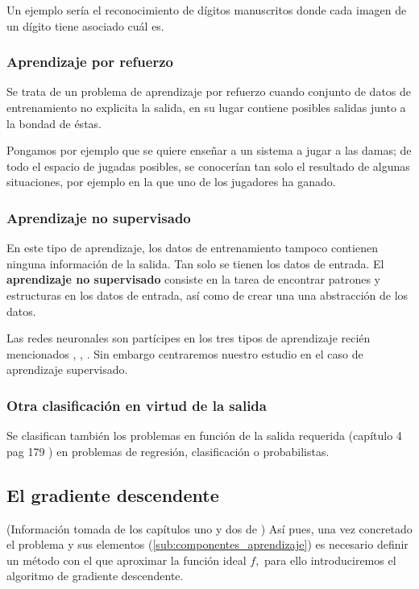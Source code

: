 Un ejemplo sería el reconocimiento de dígitos  manuscritos donde cada imagen de un dígito tiene asociado cuál es. 


\subsubsection{Aprendizaje por refuerzo}  
Se trata de un problema de aprendizaje por refuerzo 
cuando conjunto de datos de entrenamiento no explicita la salida, en su lugar contiene posibles salidas junto a la bondad de éstas. 

Pongamos por ejemplo que se quiere enseñar a un sistema a jugar
a las damas; de todo el espacio de jugadas posibles, se conocerían tan solo el resultado de algunas situaciones, por ejemplo en la que uno de los jugadores ha ganado.  

\subsubsection{Aprendizaje no supervisado}  

En este tipo de aprendizaje, los datos de entrenamiento tampoco contienen ninguna información de la salida.
 Tan solo se tienen los datos de entrada. El \textbf{aprendizaje no supervisado} 
 consiste en la tarea de encontrar patrones y estructuras en los datos de entrada, 
 así como de crear una una abstracción de los datos.  


Las redes neuronales son partícipes en los tres tipos de aprendizaje 
recién mencionados
\cite{8612259}, \cite{DBLP:journals/corr/BakerGNR16}, \cite{10.5555/2955491.2955578}. Sin embargo centraremos nuestro estudio en el caso 
de aprendizaje supervisado. 

\subsubsection*{Otra clasificación en virtud de la salida}

Se clasifican también los problemas en función de la salida requerida (capítulo 4 pag 179
\cite{BishopPaterRecognition}) en problemas de regresión, clasificación o probabilistas. 

\subsection{El gradiente descendente} 

(Información tomada de los capítulos uno y dos de \cite{learning-from-data-1-2})
Así pues, una vez concretado el problema y sus elementos 
(\ref{sub:componentes_aprendizaje}) es necesario definir un método con el que aproximar la función ideal $f,$ para ello introduciremos el algoritmo de gradiente descendente.  

